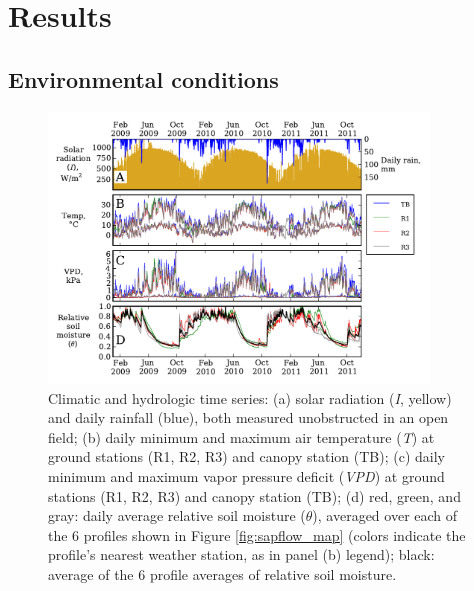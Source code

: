 \section{Results}

\subsection{Environmental conditions}

\begin{figure}[here]
\includegraphics[width=0.9\textwidth]{ch1-sapflow/figures/Figure03.pdf}
\caption{Climatic and hydrologic time series: (a) solar radiation (\textit{I}, yellow) and daily rainfall (blue), both measured unobstructed in an open field; (b) daily minimum and maximum air temperature (\textit{T}) at ground stations (R1, R2, R3) and canopy station (TB); (c) daily minimum and maximum vapor pressure deficit (\textit{VPD}) at ground stations (R1, R2, R3) and canopy station (TB); (d) red, green, and gray: daily average relative soil moisture (\textit{$\theta$}), averaged over each of the 6 profiles shown in Figure \ref{fig:sapflow_map} (colors indicate the profile's nearest weather station, as in panel (b) legend); black: average of the 6 profile averages of relative soil moisture.}
\label{fig:sapflow_met}
\end{figure}

